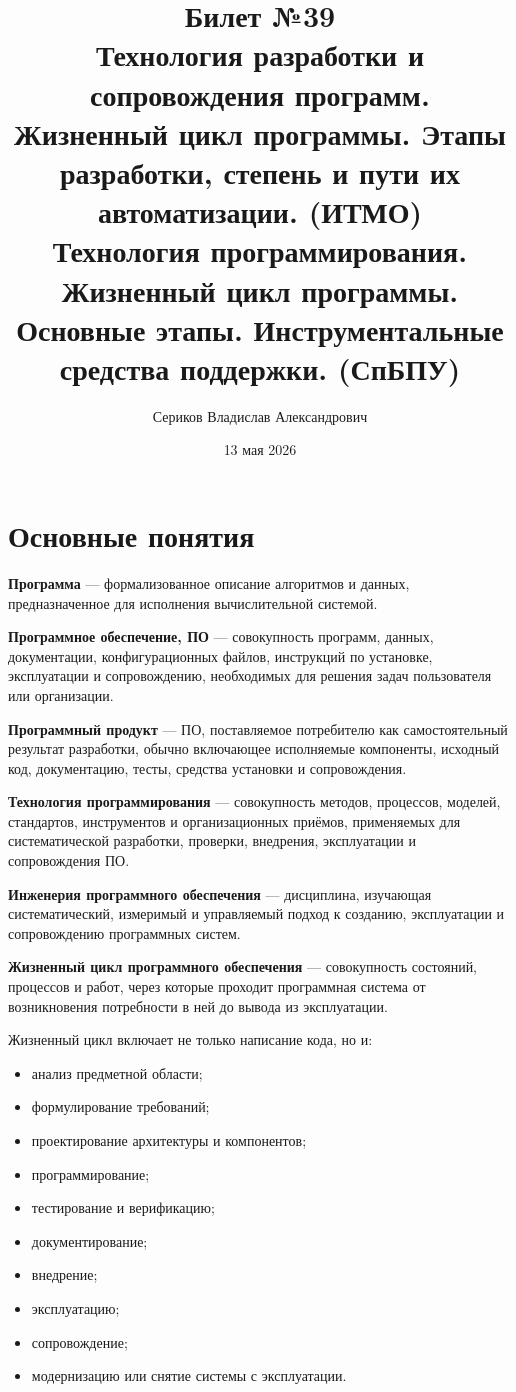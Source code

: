 \documentclass[12pt,a4paper]{article}
\title{Билет №39 \\ \small Технология разработки и сопровождения программ. Жизненный цикл программы. Этапы разработки, степень и пути их автоматизации. (ИТМО) \\ Технология программирования. Жизненный цикл программы. Основные этапы. Инструментальные средства поддержки. (СпБПУ)}
\author{Сериков Владислав Александрович}
\date{13 мая 2026}
\begin{document}
\maketitle
\tableofcontents
\newpage

\section{Основные понятия}

\textbf{Программа} --- формализованное описание алгоритмов и данных, предназначенное для исполнения вычислительной системой.

\textbf{Программное обеспечение, ПО} --- совокупность программ, данных, документации, конфигурационных файлов, инструкций по установке, эксплуатации и сопровождению, необходимых для решения задач пользователя или организации.

\textbf{Программный продукт} --- ПО, поставляемое потребителю как самостоятельный результат разработки, обычно включающее исполняемые компоненты, исходный код, документацию, тесты, средства установки и сопровождения.

\textbf{Технология программирования} --- совокупность методов, процессов, моделей, стандартов, инструментов и организационных приёмов, применяемых для систематической разработки, проверки, внедрения, эксплуатации и сопровождения ПО.

\textbf{Инженерия программного обеспечения} --- дисциплина, изучающая систематический, измеримый и управляемый подход к созданию, эксплуатации и сопровождению программных систем.

\textbf{Жизненный цикл программного обеспечения} --- совокупность состояний, процессов и работ, через которые проходит программная система от возникновения потребности в ней до вывода из эксплуатации.

Жизненный цикл включает не только написание кода, но и:
\begin{itemize}
    \item анализ предметной области;
    \item формулирование требований;
    \item проектирование архитектуры и компонентов;
    \item программирование;
    \item тестирование и верификацию;
    \item документирование;
    \item внедрение;
    \item эксплуатацию;
    \item сопровождение;
    \item модернизацию или снятие системы с эксплуатации.
\end{itemize}
\end{document}
